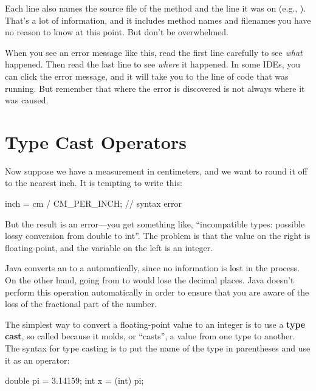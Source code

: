 Each line also names the source file of the method and the line it was on (e.g., ).
That's a lot of information, and it includes method names and filenames you have no reason to know at this point.
But don't be overwhelmed.

When you see an error message like this, read the first line carefully to see {\em what} happened.
Then read the last line to see {\em where} it happened.
In some IDEs, you can click the error message, and it will take you to the line of code that was running.
But remember that where the error is discovered is not always where it was caused.


\section{Type Cast Operators}

Now suppose we have a measurement in centimeters, and we want to round it off to the nearest inch.
It is tempting to write this:

\begin{code}
inch = cm / CM_PER_INCH;  // syntax error
\end{code}

But the result is an error---you get something like, ``incompatible types: possible lossy conversion from double to int''.
The problem is that the value on the right is floating-point, and the variable on the left is an integer.


Java converts an  to a  automatically, since no information is lost in the process.
On the other hand, going from  to  would lose the decimal places.
Java doesn't perform this operation automatically in order to ensure that you are aware of the loss of the fractional part of the number.


The simplest way to convert a floating-point value to an integer is to use a {\bf type cast}, so called because it molds, or ``casts'', a value from one type to another.
The syntax for type casting is to put the name of the type in parentheses and use it as an operator:

\begin{code}
double pi = 3.14159;
int x = (int) pi;
\end{code}

